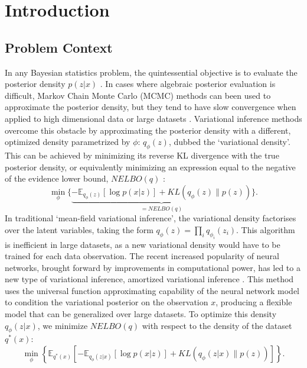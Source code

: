 \documentclass[honours,12pt, twoside]{unswthesis}
\newcommand{\E}{\mathbb{E}}
\numberwithin{equation}{section}
\theoremstyle{definition}
\begin{document}
\afterpreface
\afterpage{\clearpage}

\chapter{Introduction}\label{intro}
\section{Problem Context}
In any Bayesian statistics problem, the quintessential objective is to evaluate the posterior density $p(z|x)$ \citep{gelman}. In cases where algebraic posterior evaluation is difficult, Markov Chain Monte Carlo (MCMC) methods can been used to approximate the posterior density, but they tend to have slow convergence when applied to high dimensional data or large datasets \citep{blei}. Variational inference methods overcome this obstacle by approximating the posterior density with a different, optimized density parametrized by $\phi$: $q_\phi(z)$, dubbed the `variational density'. This can be achieved by minimizing its reverse KL divergence with the true posterior density, or equivalently minimizing an expression equal to the negative of the evidence lower bound, $NELBO(q)$ \citep{blei}:
\[\min_\phi \lbrace\underbrace{-\E_{q_\phi(z)}[\log p(x|z)]+KL(q_\phi(z)\|p(z))}_{=NELBO(q)}\rbrace.\]
In traditional `mean-field variational inference', the variational density factorises over the latent variables, taking the form $q_\phi(z)=\prod_i q_{\phi_i}(z_i)$. This algorithm is inefficient in large datasets, as a new variational density would have to be trained for each data observation. The recent increased popularity of neural networks, brought forward by improvements in computational power, has led to a new type of variational inference, amortized variational inference \citep{ADVVI}. This method uses the universal function approximating capability of the neural network model to condition the variational posterior on the observation $x$, producing a flexible model that can be generalized over large datasets. To optimize this density $q_\phi(z|x)$, we minimize $NELBO(q)$ with respect to the density of the dataset $q^*(x)$: 
\[\min_{\phi} \left\lbrace\E_{q^*(x)}\left[-\E_{q_\phi(z|x)}[\log p(x|z)]+KL(q_\phi(z|x)\|p(z))\right]\right\rbrace.\]
\end{document}
